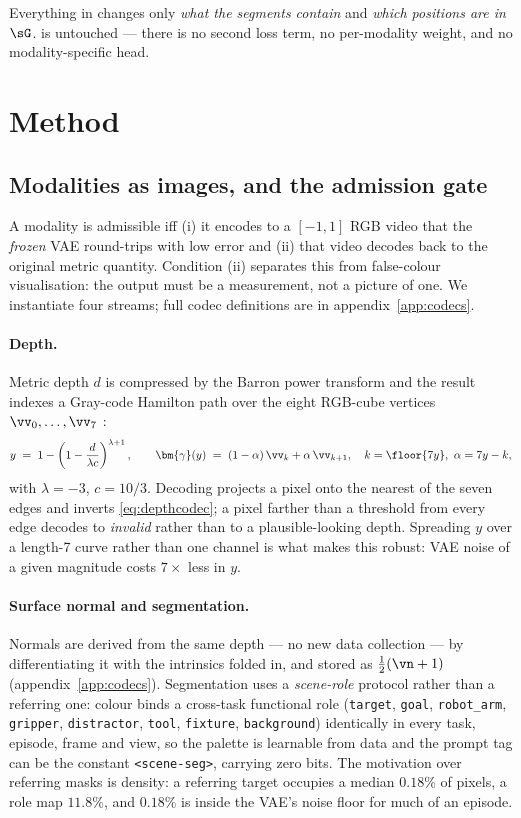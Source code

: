 \documentclass{article} %
\newcommand{\ptag}[1]{\texttt{<#1>}}   %
\newcommand{\appref}[1]{appendix~\ref{#1}}
\newcommand{\vgamma}{{\bm{\gamma}}}   %
\begin{document}
Everything in  changes only \emph{what the segments contain} and \emph{which
positions are in $\sG$}.  is untouched --- there is no second loss term, no
per-modality weight, and no modality-specific head.

\section{Method}
\label{sec:method}

\subsection{Modalities as images, and the admission gate}
\label{sec:codecs}

A modality is admissible iff (i) it encodes to a $[-1,1]$ RGB video that the \emph{frozen} VAE
round-trips with low error and (ii) that video decodes back to the original metric quantity.
Condition (ii) separates this from false-colour visualisation: the output must be a measurement,
not a picture of one. We instantiate four streams; full codec definitions are in
\appref{app:codecs}.

\paragraph{Depth.}
Metric depth $d$ is compressed by the Barron power transform \citep{barron2019general} and the
result indexes a Gray-code Hamilton path over the eight RGB-cube vertices $\vv_0,\dots,\vv_7$
\citep{gabeur2026image}:
\begin{equation}
y \;=\; 1-\left(1-\frac{d}{\lambda c}\right)^{\lambda+1},
\qquad
\vgamma(y) \;=\; (1-\alpha)\,\vv_k + \alpha\,\vv_{k+1},
\quad k=\floor{7y},\ \alpha = 7y-k,
\label{eq:depthcodec}
\end{equation}
with $\lambda=-3$, $c=10/3$. Decoding projects a pixel onto the nearest of the seven edges and
inverts \eqref{eq:depthcodec}; a pixel farther than a threshold from every edge decodes to
\emph{invalid} rather than to a plausible-looking depth. Spreading $y$ over a length-7 curve
rather than one channel is what makes this robust: VAE noise of a given magnitude costs
$7\times$ less in $y$.

\paragraph{Surface normal and segmentation.}
Normals are derived from the same depth --- no new data collection --- by differentiating it with
the intrinsics folded in, and stored as $\tfrac12(\vn+1)$ (\appref{app:codecs}). Segmentation uses
a \emph{scene-role} protocol rather than a referring one: colour binds a cross-task functional role
(\texttt{target}, \texttt{goal}, \texttt{robot\_arm}, \texttt{gripper}, \texttt{distractor},
\texttt{tool}, \texttt{fixture}, \texttt{background}) identically in every task, episode, frame and
view, so the palette is learnable from data and the prompt tag can be the constant
\ptag{scene-seg}, carrying zero bits. The motivation over referring masks is density: a referring
target occupies a median $0.18\%$ of pixels, a role map $11.8\%$, and $0.18\%$ is inside the VAE's
noise floor for much of an episode.
\end{document}
